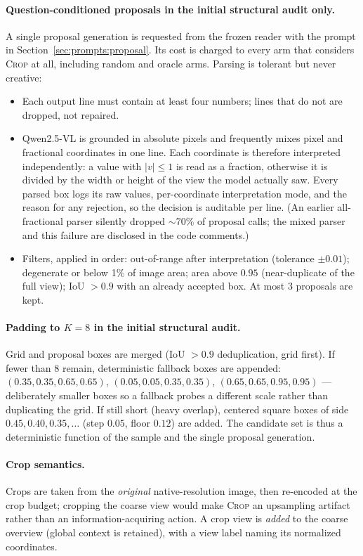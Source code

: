 \documentclass[10pt]{article}
\begin{document}
\paragraph{Question-conditioned proposals in the initial structural audit only.}
A single proposal generation is requested from the frozen reader with the
prompt in Section~\ref{sec:prompts:proposal}. Its cost is charged to every
arm that considers \textsc{Crop} at all, including random and oracle arms.
Parsing is tolerant but never creative:
\begin{itemize}
\item Each output line must contain at least four numbers; lines that do
  not are dropped, not repaired.
\item Qwen2.5-VL is grounded in absolute pixels and frequently mixes pixel
  and fractional coordinates in one line. Each coordinate is therefore
  interpreted independently: a value with $|v|\le 1$ is read as a fraction,
  otherwise it is divided by the width or height of the view the model
  actually saw. Every parsed box logs its raw values, per-coordinate
  interpretation mode, and the reason for any rejection, so the decision is
  auditable per line. (An earlier all-fractional parser silently dropped
  $\sim$70\% of proposal calls; the mixed parser and this failure are
  disclosed in the code comments.)
\item Filters, applied in order: out-of-range after interpretation
  (tolerance $\pm 0.01$); degenerate or below 1\% of image area; area
  above $0.95$ (near-duplicate of the full view); IoU $> 0.9$ with an
  already accepted box. At most 3 proposals are kept.
\end{itemize}

\paragraph{Padding to $K=8$ in the initial structural audit.}
Grid and proposal boxes are merged (IoU $>0.9$ deduplication, grid first).
If fewer than 8 remain, deterministic fallback boxes are appended:
$(0.35,0.35,0.65,0.65)$, $(0.05,0.05,0.35,0.35)$,
$(0.65,0.65,0.95,0.95)$ --- deliberately smaller boxes so a fallback probes
a different scale rather than duplicating the grid. If still short (heavy
overlap), centered square boxes of side $0.45, 0.40, 0.35, \ldots$
(step $0.05$, floor $0.12$) are added. The candidate set is thus a
deterministic function of the sample and the single proposal generation.

\paragraph{Crop semantics.}
Crops are taken from the \emph{original} native-resolution image, then
re-encoded at the crop budget; cropping the coarse view would make
\textsc{Crop} an upsampling artifact rather than an information-acquiring
action. A crop view is \emph{added} to the coarse overview (global context
is retained), with a view label naming its normalized coordinates.
\end{document}
